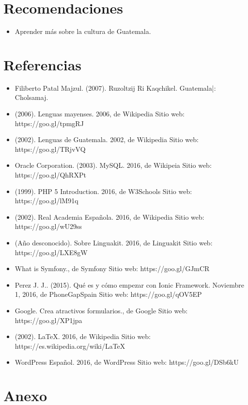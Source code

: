 \documentclass[a4paper,openright,11pt]{article}
\begin{document}
\section{Recomendaciones}
\begin{itemize}
	\item Aprender más sobre la cultura de Guatemala.
\end{itemize}
\newpage

\section{Referencias}
\begin{itemize}
	\item Filiberto Patal Majzul. (2007). Ruzoltzij Ri Kaqchikel. Guatemala|: Cholsamaj.
	\item (2006). Lenguas mayenses. 2006, de Wikipedia Sitio web: https://goo.gl/tpmgRJ
	\item (2002). Lenguas de Guatemala. 2002, de Wikipedia Sitio web: https://goo.gl/TRjvVQ
	\item Oracle Corporation. (2003). MySQL. 2016, de Wikipeia Sitio web: https://goo.gl/QhRXPt
	\item (1999). PHP 5 Introduction. 2016, de W3Schools Sitio web: https://goo.gl/lM91q
	\item (2002). Real Academia Española. 2016, de Wikipedia Sitio web: https://goo.gl/wU29ss
	\item (Año desconocido). Sobre Linguakit. 2016, de Linguakit Sitio web: https://goo.gl/LXE8gW
	\item What is Symfony., de Symfony Sitio web: https://goo.gl/GJmCR
	\item Perez J. J.. (2015). Qué es y cómo empezar con Ionic Framework. Noviembre 1, 2016, de PhoneGapSpain Sitio web: https://goo.gl/qOV5EP
	\item Google. Crea atractivos formularios., de Google Sitio web: https://goo.gl/XP1jpa
	\item (2002). LaTeX. 2016, de Wikipedia Sitio web: https://es.wikipedia.org/wiki/LaTeX
	\item WordPress Español. 2016, de WordPress Sitio web: https://goo.gl/DSb6kU
\end{itemize}
\newpage

\section{Anexo}
\end{document}
